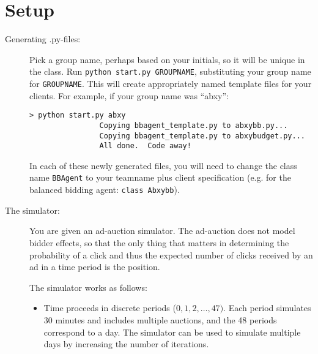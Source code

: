 \documentclass[11pt]{article}
\begin{document}
\section{Setup}
	\begin{description}

		\item[Generating .py-files:] Pick a group name, perhaps based on your initials, so it will be unique in the class. Run \verb+python start.py GROUPNAME+, substituting your group name for \verb+GROUPNAME+. This will create appropriately named template files for your clients. For example, if your group name was ``abxy'':
			\begin{verbatim}> python start.py abxy
				Copying bbagent_template.py to abxybb.py...
				Copying bbagent_template.py to abxybudget.py...
				All done.  Code away!
			\end{verbatim}
			In each of these newly generated files, you will need to change the class name \verb+BBAgent+  to your teamname plus client specification (e.g. for the balanced bidding agent: \verb+class Abxybb+).
	
		\item[The simulator:] You are given an ad-auction simulator. 
The ad-auction does not model bidder effects, so that the only thing that 
matters in determining the probability of a click and thus the expected
number of clicks received by an ad in a time period is the position. 

The simulator works as follows:
			\begin{itemize}
				\item Time proceeds in discrete periods ($0, 1, 2, \ldots, 47)$. Each period simulates 30 minutes and includes multiple auctions,
and the 48 periods correspond to a day. The simulator can be used to simulate
multiple days by increasing the number of iterations.


\end{itemize}
\end{description}
\end{document}
